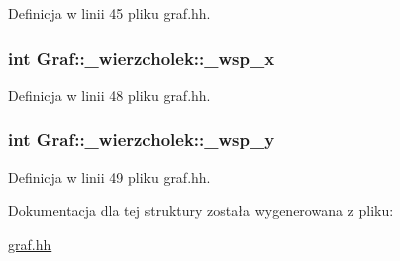 \-Definicja w linii 45 pliku graf.\-hh.

\hypertarget{struct_graf_1_1__wierzcholek_a21ade81ba66bf560548f2ed5d09932e0}{
\subsubsection[{\-\_\-wsp\-\_\-x}]{\setlength{\rightskip}{0pt plus 5cm}int {\bf \-Graf\-::\-\_\-wierzcholek\-::\-\_\-wsp\-\_\-x}}}\label{struct_graf_1_1__wierzcholek_a21ade81ba66bf560548f2ed5d09932e0}


\-Definicja w linii 48 pliku graf.\-hh.

\hypertarget{struct_graf_1_1__wierzcholek_a8480b0d0566935fa8687c6dd7b8fa94a}{
\subsubsection[{\-\_\-wsp\-\_\-y}]{\setlength{\rightskip}{0pt plus 5cm}int {\bf \-Graf\-::\-\_\-wierzcholek\-::\-\_\-wsp\-\_\-y}}}\label{struct_graf_1_1__wierzcholek_a8480b0d0566935fa8687c6dd7b8fa94a}


\-Definicja w linii 49 pliku graf.\-hh.



\-Dokumentacja dla tej struktury została wygenerowana z pliku\-:\begin{DoxyCompactItemize}
\item 
\hyperlink{graf_8hh}{graf.\-hh}\end{DoxyCompactItemize}
